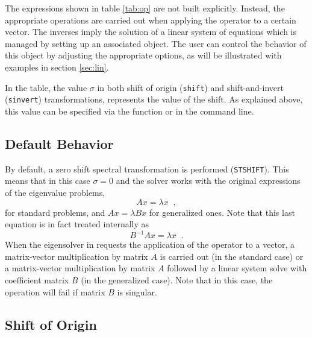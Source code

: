	The expressions shown in table \ref{tab:op} are not built explicitly. Instead, the appropriate operations are carried out when applying the operator to a certain vector. The inverses imply the solution of a linear system of equations which is managed by setting up an associated  object. The user can control the behavior of this object by adjusting the appropriate options, as will be illustrated with examples in section \ref{sec:lin}.

	In the table, the value $\sigma$ in both shift of origin (\texttt{shift}) and shift-and-invert (\texttt{sinvert}) transformations, represents the value of the shift. As explained above, this value can be specified via the  function or in the command line.

\subsection{Default Behavior}

	By default, a zero shift spectral transformation is performed (\texttt{STSHIFT}). This means that in this case $\sigma=0$ and the solver works with the original expressions of the eigenvalue problems,
\begin{equation}Ax=\lambda x\;\;,\end{equation}
for standard problems, and $Ax=\lambda Bx$ for generalized ones. Note that this last equation is in fact treated internally as
\begin{equation}B^{-1}Ax=\lambda x\;\;.\end{equation}
When the eigensolver in  requests the application of the operator to a vector, a matrix-vector multiplication by matrix $A$ is carried out (in the standard case) or a matrix-vector multiplication by matrix $A$ followed by a linear system solve with coefficient matrix $B$ (in the generalized case). Note that in this case, the operation will fail if matrix $B$ is singular.

\subsection{Shift of Origin}

